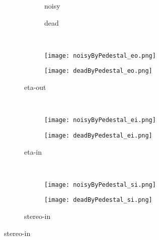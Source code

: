 \documentclass[
twoside,            %
BCOR1.4cm,          %
10pt,               %
headings=normal,    %
headsepline,        %
clearplainpage,		%
final,              %
div=14,
open=right,
bibliography=toc
]{scrreprt}
\begin{document}
\begin{figure}[!h]
	\begin{subfigure}[b]{\textwidth}
		\begin{subfigure}[b]{0.48\textwidth}
			\centering
			noisy
		\end{subfigure}
		\hfill
		\begin{subfigure}[b]{0.48\textwidth}
			\centering
			dead
		\end{subfigure}
	\end{subfigure}
	\vspace{1mm}
	\\
	\begin{subfigure}[b]{\textwidth}
		\begin{subfigure}[b]{0.49\textwidth}
			\centering
			\texttt{[image: noisyByPedestal\_eo.png]}
		\end{subfigure}
		\hfill
		\begin{subfigure}[b]{0.49\textwidth}
			\centering
			\texttt{[image: deadByPedestal\_eo.png]}
		\end{subfigure}
		\caption{
			eta-out
		}
	\end{subfigure}
	\vspace{1mm}
	\\
	\begin{subfigure}[b]{\textwidth}
		\begin{subfigure}[b]{0.49\textwidth}
			\centering
			\texttt{[image: noisyByPedestal\_ei.png]}
		\end{subfigure}
		\hfill
		\begin{subfigure}[b]{0.49\textwidth}
			\centering
			\texttt{[image: deadByPedestal\_ei.png]}
		\end{subfigure}
		\caption{
			eta-in
		}
	\end{subfigure}
	\vspace{1mm}
	\\
	\begin{subfigure}[b]{\textwidth}
		\begin{subfigure}[b]{0.49\textwidth}
			\centering
			\texttt{[image: noisyByPedestal\_si.png]}
		\end{subfigure}
		\hfill
		\begin{subfigure}[b]{0.49\textwidth}
			\centering
			\texttt{[image: deadByPedestal\_si.png]}
		\end{subfigure}
		\caption{
			stereo-in
		}
	\end{subfigure}

\end{figure}
\end{document}
